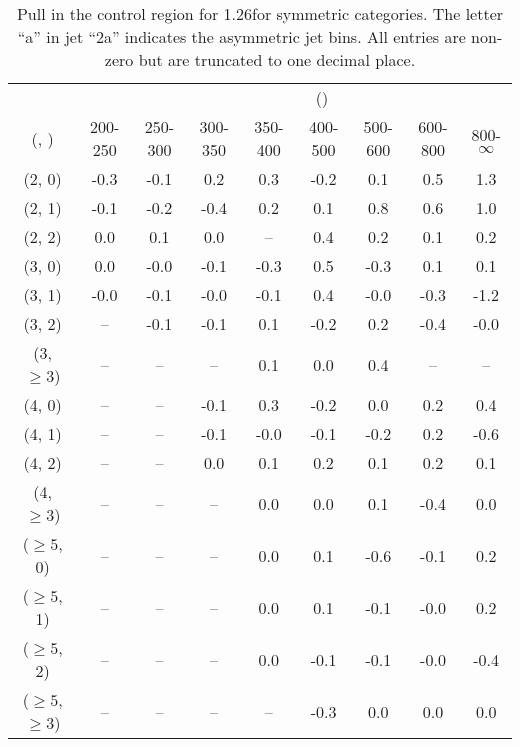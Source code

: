 \begin{table}[h!]
\tiny
\centering
\caption{Pull in the \mj control region for 1.26\ifb for symmetric categories. The letter ``a'' in jet \eg ``2a''  indicates the asymmetric jet bins. All entries are non-zero but are truncated to one decimal place.\label{tab:pullsep_ewk_mu_sym}}
\begin{tabular}
{ccccccccc}
	\hline\hline
&	& \multicolumn{8}{c}{\scalht (\gev)} \\ 
	 (\njet,  \nb) & 200-250 & 250-300 & 300-350 & 350-400 & 400-500 & 500-600 & 600-800 & 800-$\infty$ \\ [0.8ex] 
\hline
	(2, 0) & -0.3 & -0.1 & 0.2 & 0.3 & -0.2 & 0.1 & 0.5 & 1.3 \\[0.5ex] 
	(2, 1) & -0.1 & -0.2 & -0.4 & 0.2 & 0.1 & 0.8 & 0.6 & 1.0 \\[0.5ex] 
	(2, 2) & 0.0 & 0.1 & 0.0 & -- & 0.4 & 0.2 & 0.1 & 0.2 \\[0.5ex] 
	(3, 0) & 0.0 & -0.0 & -0.1 & -0.3 & 0.5 & -0.3 & 0.1 & 0.1 \\[0.5ex] 
	(3, 1) & -0.0 & -0.1 & -0.0 & -0.1 & 0.4 & -0.0 & -0.3 & -1.2 \\[0.5ex] 
	(3, 2) & -- & -0.1 & -0.1 & 0.1 & -0.2 & 0.2 & -0.4 & -0.0 \\[0.5ex] 
	(3, $\ge3$) & -- & -- & -- & 0.1 & 0.0 & 0.4 & -- & -- \\[0.5ex] 
	(4, 0) & -- & -- & -0.1 & 0.3 & -0.2 & 0.0 & 0.2 & 0.4 \\[0.5ex] 
	(4, 1) & -- & -- & -0.1 & -0.0 & -0.1 & -0.2 & 0.2 & -0.6 \\[0.5ex] 
	(4, 2) & -- & -- & 0.0 & 0.1 & 0.2 & 0.1 & 0.2 & 0.1 \\[0.5ex] 
	(4, $\ge3$) & -- & -- & -- & 0.0 & 0.0 & 0.1 & -0.4 & 0.0 \\[0.5ex] 
	($\ge5$, 0) & -- & -- & -- & 0.0 & 0.1 & -0.6 & -0.1 & 0.2 \\[0.5ex] 
	($\ge5$, 1) & -- & -- & -- & 0.0 & 0.1 & -0.1 & -0.0 & 0.2 \\[0.5ex] 
	($\ge5$, 2) & -- & -- & -- & 0.0 & -0.1 & -0.1 & -0.0 & -0.4 \\[0.5ex] 
	($\ge5$, $\ge3$) & -- & -- & -- & -- & -0.3 & 0.0 & 0.0 & 0.0 \\[0.5ex] 
	\hline
	\hline
\end{tabular}
\end{table}
